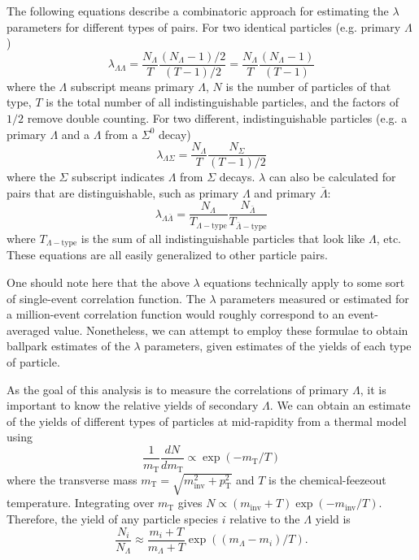 The following equations describe a combinatoric approach for estimating the $\lambda$ parameters for different types of pairs.  
For two identical particles (e.g. primary $\Lambda$) \begin{equation}
\label{eq:LambdaIdentical}
\lambda_{\Lambda\Lambda} = \frac{N_\Lambda}{T}\frac{(N_\Lambda -1)/2}{(T-1)/2} = \frac{N_\Lambda}{T}\frac{(N_\Lambda -1)}{(T-1)}
\end{equation}
where the $\Lambda$ subscript means primary $\Lambda$, $N$ is the number of particles of that type, $T$ is the total number of all indistinguishable particles, and the factors of $1/2$ remove double counting.  
For two different, indistinguishable particles (e.g. a primary $\Lambda$ and a $\Lambda$ from a $\Sigma^0$ decay)
\begin{equation}
\lambda_{\Lambda\Sigma} = \frac{N_\Lambda}{T} \frac{N_\Sigma}{(T-1)/2}
\end{equation}
where the $\Sigma$ subscript indicates $\Lambda$ from $\Sigma$ decays.  
$\lambda$ can also be calculated for pairs that are distinguishable, such as primary $\Lambda$ and primary $\bar{\Lambda}$:
\begin{equation}
\lambda_{\Lambda\bar{\Lambda}} = \frac{N_\Lambda}{T_{\Lambda-\mathrm{type}}} \frac{N_{\bar{\Lambda}}}{T_{\bar{\Lambda}-\mathrm{type}}}
\end{equation}
where $T_{\Lambda-\mathrm{type}}$ is the sum of all indistinguishable particles that look like $\Lambda$, etc.  
These equations are all easily generalized to other particle pairs.

One should note here that the above $\lambda$ equations technically apply to some sort of single-event correlation function.  
The $\lambda$ parameters measured or estimated for a million-event correlation function would roughly correspond to an event-averaged value.  
Nonetheless, we can attempt to employ these formulae to obtain ballpark estimates of the $\lambda$ parameters, given estimates of the yields of each type of particle.

As the goal of this analysis is to measure the correlations of primary $\Lambda$, it is important to know the relative yields of secondary $\Lambda$.  
We can obtain an estimate \cite{Florkowski:2010zz} of the yields of different types of particles at mid-rapidity from a thermal model using
\begin{equation}
\frac{1}{m_{\mathrm{T}}}\frac{dN}{dm_{\mathrm{T}}} \propto \exp{(-m_\mathrm{T}/T)}
\end{equation}
where the transverse mass $m_\mathrm{T} = \sqrt{m^2_{\mathrm{inv}} + p^2_{\mathrm{T}}}$ and $T$ is the chemical-feezeout temperature.  
Integrating over $m_\mathrm{T}$ gives $N \propto (m_\mathrm{inv} + T) \exp{(-m_\mathrm{inv}/T)}$.  
Therefore, the yield of any particle species $i$ relative to the $\Lambda$ yield is
\begin{equation}
\frac{N_i}{N_\Lambda} \approx \frac{m_i + T}{m_\Lambda + T} \exp{((m_\Lambda - m_i)/T)}.
\end{equation}

